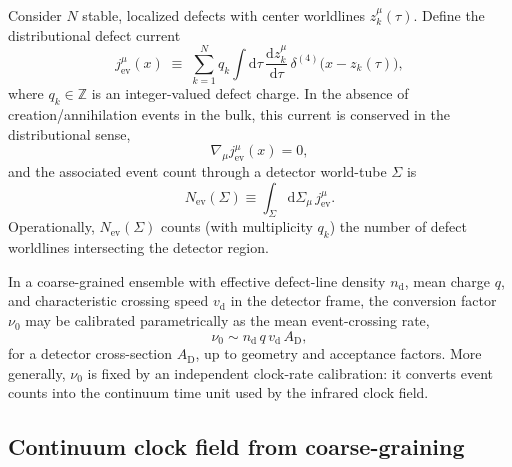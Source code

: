 \documentclass[11pt, a4paper]{article}
\theoremstyle{definition}
\theoremstyle{plain}
\theoremstyle{remark}
\numberwithin{equation}{section}
\newcommand{\dd}{\mathrm{d}}
\begin{document}
        Consider $N$ stable, localized defects with center worldlines $z_k^\mu(\tau)$. Define the distributional defect current
        \begin{equation}
            j^\mu_{\mathrm{ev}}(x)
            \;\equiv\;
            \sum_{k=1}^{N} q_k \int \dd\tau\,
            \frac{\dd z_k^\mu}{\dd\tau}\,
            \delta^{(4)}\!\big(x-z_k(\tau)\big),
            \label{eq:defectCurrent}
        \end{equation}
        where $q_k\in\mathbb{Z}$ is an integer-valued defect charge. In the absence of creation/annihilation events in the bulk, this current is conserved in the distributional sense,
        \begin{equation}
            \nabla_\mu j^\mu_{\mathrm{ev}}(x)=0,
        \end{equation}
        and the associated event count through a detector world-tube $\Sigma$ is
        \begin{equation}
            N_{\mathrm{ev}}(\Sigma)\equiv\int_{\Sigma}\dd\Sigma_\mu\, j^\mu_{\mathrm{ev}}.
        \end{equation}
        Operationally, $N_{\mathrm{ev}}(\Sigma)$ counts (with multiplicity $q_k$) the number of defect worldlines intersecting the detector region.
        
        In a coarse-grained ensemble with effective defect-line density $n_{\mathrm d}$, mean charge $q$, and characteristic crossing speed $v_{\mathrm d}$ in the detector frame, the conversion factor $\nu_0$ may be calibrated parametrically as the mean event-crossing rate,
        \begin{equation}
            \nu_0 \sim n_{\mathrm d}\,q\,v_{\mathrm d}\,A_{\mathrm D},
            \label{eq:nu0DefectCalibration}
        \end{equation}
        for a detector cross-section $A_{\mathrm D}$, up to geometry and acceptance factors. More generally, $\nu_0$ is fixed by an independent clock-rate calibration: it converts event counts into the continuum time unit used by the infrared clock field.
    
    \subsection{Continuum clock field from coarse-graining}
        
\end{document}
